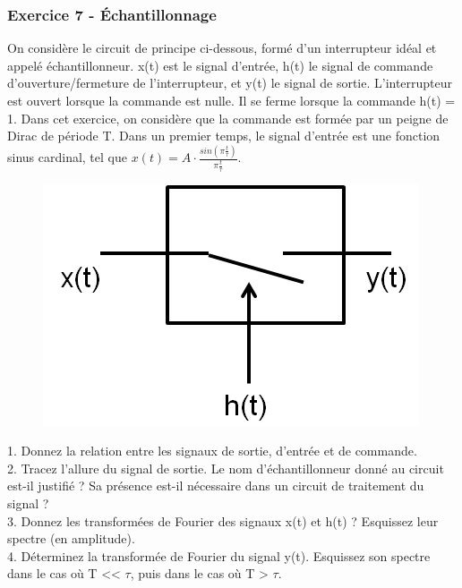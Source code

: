 \documentclass[11pt]{report}
\begin{document}
	
	
	
	\vspace{1\baselineskip}
	
	\subsubsection{Exercice 7 - Échantillonnage}
	
	On considère le circuit de principe ci-dessous, formé d'un interrupteur idéal et appelé échantillonneur. x(t) est le signal d'entrée, h(t) le signal de commande d'ouverture/fermeture de l'interrupteur, et y(t) le signal de sortie. L'interrupteur est ouvert lorsque la commande est nulle. Il se ferme lorsque la commande h(t) = 1.
	Dans cet exercice, on considère que la commande est formée par un peigne de Dirac de période T. Dans un premier temps, le signal d'entrée est une fonction sinus cardinal, tel que $x(t)=A\cdot \frac{sin(\pi \frac{t}{\tau})}{\pi \frac{t}{\tau}}$.
	
	\begin{figure}[h!]
		\centering
		\includegraphics[scale=0.6]{images/Echantillonneur.png} 
	\end{figure}
	
	
	1. Donnez la relation entre les signaux de sortie, d'entrée et de commande.\\
	
	2. Tracez l'allure du signal de sortie. Le nom d'échantillonneur donné au circuit est-il justifié ? Sa présence est-il nécessaire dans un circuit de traitement du signal ?\\
	
	3. Donnez les transformées de Fourier des signaux x(t) et h(t) ? Esquissez leur spectre (en amplitude).\\
	
	4. Déterminez la transformée de Fourier du signal y(t). Esquissez son spectre dans le cas où T << $\tau$, puis dans le cas où T > $\tau$.\\
	
\end{document}
